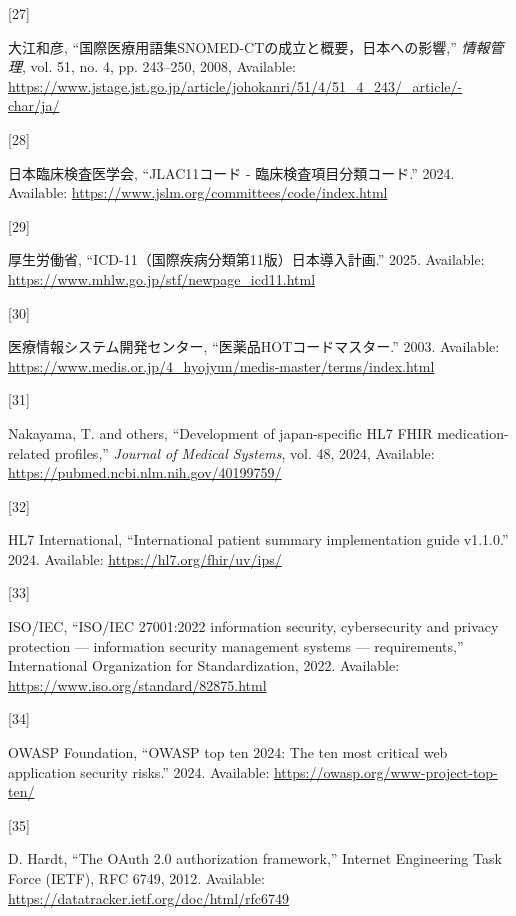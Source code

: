 \documentclass[
  a4paper,
  a4paper,
  11pt]{ltjsbook}
\newlength{\cslhangindent}
\newlength{\csllabelwidth}
\newenvironment{CSLReferences}[2] %
 {\begin{list}{}{%
  \setlength{\itemindent}{0pt}
  \setlength{\leftmargin}{0pt}
  \setlength{\parsep}{0pt}
  \ifodd #1
   \setlength{\leftmargin}{\cslhangindent}
   \setlength{\itemindent}{-1\cslhangindent}
  \fi
  \setlength{\itemsep}{#2\baselineskip}}}
 {\end{list}}
\newcommand{\CSLLeftMargin}[1]{\parbox[t]{\csllabelwidth}{\strut#1\strut}}
\newcommand{\CSLRightInline}[1]{\parbox[t]{\linewidth - \csllabelwidth}{\strut#1\strut}}
\begin{document}
\begin{CSLReferences}{0}{0}
\CSLLeftMargin{{[}27{]} }%
\CSLRightInline{大江和彦,
{``国際医療用語集SNOMED-CTの成立と概要，日本への影響,''}
\emph{情報管理}, vol. 51, no. 4, pp. 243--250, 2008, Available:
\url{https://www.jstage.jst.go.jp/article/johokanri/51/4/51_4_243/_article/-char/ja/}}

\CSLLeftMargin{{[}28{]} }%
\CSLRightInline{日本臨床検査医学会, {``JLAC11コード -
臨床検査項目分類コード.''} 2024. Available:
\url{https://www.jslm.org/committees/code/index.html}}

\CSLLeftMargin{{[}29{]} }%
\CSLRightInline{厚生労働省,
{``ICD-11（国際疾病分類第11版）日本導入計画.''} 2025. Available:
\url{https://www.mhlw.go.jp/stf/newpage_icd11.html}}

\CSLLeftMargin{{[}30{]} }%
\CSLRightInline{医療情報システム開発センター,
{``医薬品HOTコードマスター.''} 2003. Available:
\url{https://www.medis.or.jp/4_hyojyun/medis-master/terms/index.html}}

\CSLLeftMargin{{[}31{]} }%
\CSLRightInline{Nakayama, T. and others, {``Development of
japan-specific HL7 FHIR medication-related profiles,''} \emph{Journal of
Medical Systems}, vol. 48, 2024, Available:
\url{https://pubmed.ncbi.nlm.nih.gov/40199759/}}

\CSLLeftMargin{{[}32{]} }%
\CSLRightInline{HL7 International, {``International patient summary
implementation guide v1.1.0.''} 2024. Available:
\url{https://hl7.org/fhir/uv/ips/}}

\CSLLeftMargin{{[}33{]} }%
\CSLRightInline{ISO/IEC, {``ISO/IEC 27001:2022 information security,
cybersecurity and privacy protection --- information security management
systems --- requirements,''} International Organization for
Standardization, 2022. Available:
\url{https://www.iso.org/standard/82875.html}}

\CSLLeftMargin{{[}34{]} }%
\CSLRightInline{OWASP Foundation, {``OWASP top ten 2024: The ten most
critical web application security risks.''} 2024. Available:
\url{https://owasp.org/www-project-top-ten/}}

\CSLLeftMargin{{[}35{]} }%
\CSLRightInline{D. Hardt, {``The OAuth 2.0 authorization framework,''}
Internet Engineering Task Force (IETF), RFC 6749, 2012. Available:
\url{https://datatracker.ietf.org/doc/html/rfc6749}}


\end{CSLReferences}
\end{document}
